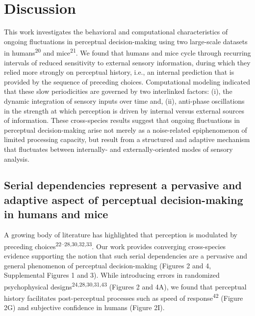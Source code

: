 \documentclass[
]{article}
\begin{document}
\newpage

\hypertarget{discussion}{%
\section{Discussion}\label{discussion}}

This work investigates the behavioral and computational characteristics
of ongoing fluctuations in perceptual decision-making using two
large-scale datasets in humans\textsuperscript{20} and
mice\textsuperscript{21}. We found that humans and mice cycle through
recurring intervals of reduced sensitivity to external sensory
information, during which they relied more strongly on perceptual
history, i.e., an internal prediction that is provided by the sequence
of preceding choices. Computational modeling indicated that these slow
periodicities are governed by two interlinked factors: (i), the dynamic
integration of sensory inputs over time and, (ii), anti-phase
oscillations in the strength at which perception is driven by internal
versus external sources of information. These cross-species results
suggest that ongoing fluctuations in perceptual decision-making arise
not merely as a noise-related epiphenomenon of limited processing
capacity, but result from a structured and adaptive mechanism that
fluctuates between internally- and externally-oriented modes of sensory
analysis.

\hypertarget{serial-dependencies-represent-a-pervasive-and-adaptive-aspect-of-perceptual-decision-making-in-humans-and-mice}{%
\subsection{Serial dependencies represent a pervasive and adaptive
aspect of perceptual decision-making in humans and
mice}\label{serial-dependencies-represent-a-pervasive-and-adaptive-aspect-of-perceptual-decision-making-in-humans-and-mice}}

A growing body of literature has highlighted that perception is
modulated by preceding choices\textsuperscript{22--28,30,32,33}. Our
work provides converging cross-species evidence supporting the notion
that such serial dependencies are a pervasive and general phenomenon of
perceptual decision-making (Figures 2 and 4, Supplemental Figures 1 and
3). While introducing errors in randomized psychophysical
designs\textsuperscript{24,28,30,31,43} (Figures 2 and 4A), we found
that perceptual history facilitates post-perceptual processes such as
speed of response\textsuperscript{42} (Figure 2G) and subjective
confidence in humans (Figure 2I).
\end{document}
